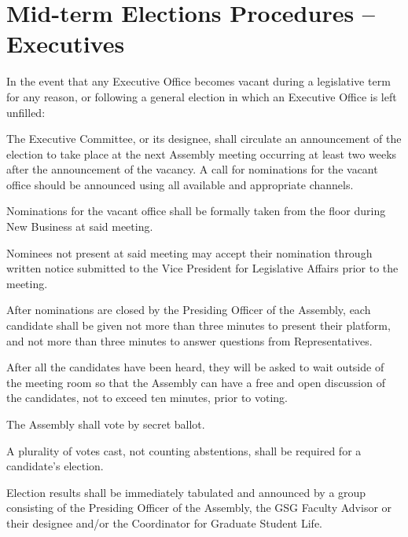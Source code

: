 \section{Mid-term Elections Procedures – Executives}
In the event that any Executive Office becomes vacant during a legislative term for any reason, or following a general election in which an Executive Office is left unfilled:
\begin{bylaws-number}
  \item The Executive Committee, or its designee, shall circulate an announcement of the election to take place at the next Assembly meeting occurring at least two weeks after the announcement of the vacancy. A call for nominations for the vacant office should be announced using all available and appropriate channels.
  \item Nominations for the vacant office shall be formally taken from the floor during New Business at said meeting.
  \item Nominees not present at said meeting may accept their nomination through written notice submitted to the Vice President for Legislative Affairs prior to the meeting.
  \item After nominations are closed by the Presiding Officer of the Assembly, each candidate shall be given not more than three minutes to present their platform, and not more than three minutes to answer questions from Representatives.
  \item After all the candidates have been heard, they will be asked to wait outside of the meeting room so that the Assembly can have a free and open discussion of the candidates, not to exceed ten minutes, prior to voting.
  \item The Assembly shall vote by secret ballot.
  \item A plurality of votes cast, not counting abstentions, shall be required for a candidate’s election.
  \item Election results shall be immediately tabulated and announced by a group consisting of the Presiding Officer of the Assembly, the GSG Faculty Advisor or their designee and/or the Coordinator for Graduate Student Life.
\end{bylaws-number}

